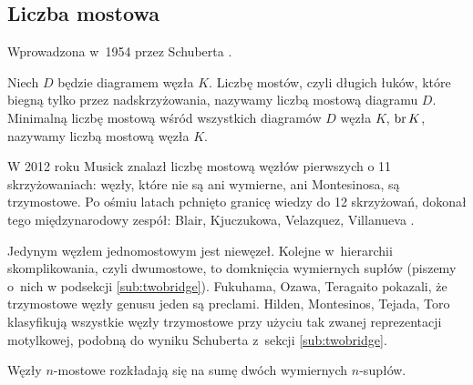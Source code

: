 
\subsection{Liczba mostowa}
%

Wprowadzona w~1954 przez Schuberta \cite{schubert1954}.
%

\begin{definition}
    Niech $D$ będzie diagramem węzła $K$.
    Liczbę mostów, czyli długich łuków, które biegną tylko przez nadskrzyżowania, nazywamy liczbą mostową diagramu $D$.
    Minimalną liczbę mostową wśród wszystkich diagramów $D$ węzła $K$, $\operatorname{br} K$, nazywamy liczbą mostową węzła $K$.
\end{definition}

W 2012 roku Musick \cite{musick2012} znalazł liczbę mostową węzłów pierwszych o 11 skrzyżowaniach: węzły, które nie są ani wymierne, ani Montesinosa, są trzymostowe.
%
Po ośmiu latach pchnięto granicę wiedzy do 12 skrzyżowań, dokonał tego międzynarodowy zespół: Blair, Kjuczukowa, Velazquez, Villanueva \cite{blair2020}.
%
%
%
%

Jedynym węzłem jednomostowym jest niewęzeł.
Kolejne w~hierarchii skomplikowania, czyli dwumostowe, to domknięcia wymiernych supłów (piszemy o~nich w podsekcji \ref{sub:twobridge}).
Fukuhama, Ozawa, Teragaito \cite{fukuhama1999} pokazali, że trzymostowe węzły genusu jeden są preclami.
%
%
%
%
%
%
Hilden, Montesinos, Tejada, Toro \cite{hilden2012} klasyfikują wszystkie węzły trzymostowe przy użyciu tak zwanej reprezentacji motylkowej, podobną do wyniku Schuberta z~sekcji \ref{sub:twobridge}.
%
%
%
%
%
%
%

Węzły $n$-mostowe rozkładają się na sumę dwóch wymiernych $n$-supłów.
%


